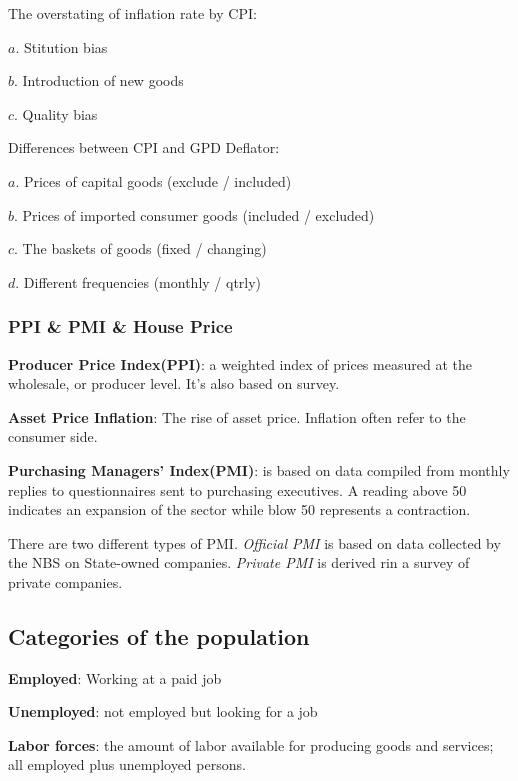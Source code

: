 \documentclass[10pt, a4paper]{article}
\begin{document}
            The overstating of inflation rate by CPI:

                $a$. Stitution bias
            
                $b$. Introduction of new goods 
            
                $c$. Quality bias
            \newline 

            Differences between CPI and GPD Deflator:

            $a$. Prices of capital goods (exclude / included)
            
            $b$. Prices of imported consumer goods (included / excluded)

            $c$. The baskets of goods (fixed / changing)

            $d$. Different frequencies (monthly / qtrly)

            \subsubsection{PPI \& PMI \& House Price}
            
            \textbf{Producer Price Index(PPI)}: a weighted index of prices measured at the wholesale, or producer level. It's also based on survey. 

            \textbf{Asset Price Inflation}: The rise of asset price. Inflation often refer to the consumer side. 

            \textbf{Purchasing Managers' Index(PMI)}: is based on data compiled from monthly replies to questionnaires sent to purchasing executives. A reading above 50 indicates an expansion of the sector while blow 50 represents a contraction. 

            There are two different types of PMI. \emph{Official PMI} is based on data collected by the NBS on State-owned companies. \emph{Private PMI} is derived rin a survey of private companies. 
            
        \subsection{Categories of the population}  
            \textbf{Employed}: Working at a paid job 
            
            \textbf{Unemployed}: not employed but looking for a job 
            
            \textbf{Labor forces}: the amount of labor available for producing goods 
            and services; all employed plus unemployed persons. 
            
\end{document}
